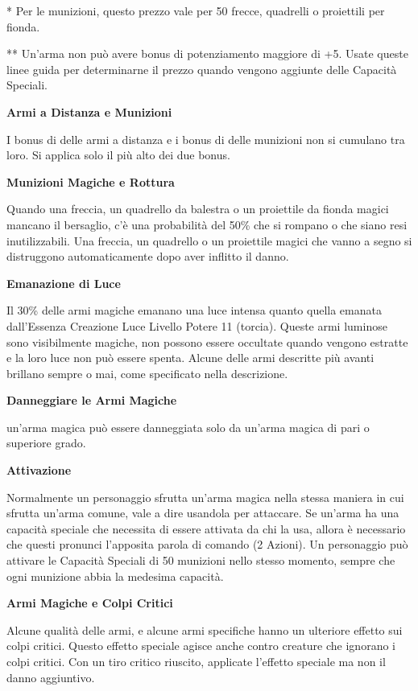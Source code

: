 \documentclass[a4paper,11pt,twoside,openany]{book}
\begin{document}
{*} Per le munizioni, questo prezzo vale per 50 frecce, quadrelli o proiettili per fionda.

	{*}{*} Un'arma non può avere bonus di potenziamento maggiore di +5. Usate queste linee guida per determinarne il prezzo quando vengono aggiunte delle Capacità Speciali.

\bigskip

\textbf{Armi a Distanza e Munizioni}

I bonus di delle armi a distanza e i bonus di delle munizioni non si cumulano tra loro. Si applica solo il più alto dei due bonus.

\textbf{Munizioni Magiche e Rottura}

Quando una freccia, un quadrello da balestra o un proiettile da fionda magici mancano il bersaglio, c'è una probabilità del 50\% che si rompano o che siano resi inutilizzabili. Una freccia, un quadrello o un proiettile magici che vanno a segno si distruggono automaticamente dopo aver inflitto il danno.

\textbf{Emanazione di Luce}

Il 30\% delle armi magiche emanano una luce intensa quanto quella emanata dall'Essenza Creazione Luce Livello Potere 11 (torcia). Queste armi luminose sono visibilmente magiche, non possono essere occultate quando vengono estratte e la loro luce non può essere spenta. Alcune delle armi descritte più avanti brillano sempre o mai, come specificato nella descrizione.

\textbf{Danneggiare le Armi Magiche}

un'arma magica può essere danneggiata solo da un'arma magica di pari o superiore grado.

\textbf{Attivazione}

Normalmente un personaggio sfrutta un'arma magica nella stessa maniera in cui sfrutta un'arma comune, vale a dire usandola per attaccare. Se un'arma ha una capacità speciale che necessita di essere attivata da chi la usa, allora è necessario che questi pronunci l'apposita parola di comando (2 Azioni). Un personaggio può attivare le Capacità Speciali di 50 munizioni nello stesso momento, sempre che ogni munizione abbia la medesima capacità.

\textbf{Armi Magiche e Colpi Critici}

Alcune qualità delle armi, e alcune armi specifiche hanno un ulteriore effetto sui colpi critici. Questo effetto speciale agisce anche contro creature che ignorano i colpi critici. Con un tiro critico riuscito, applicate l'effetto speciale ma non il danno aggiuntivo.
\end{document}
